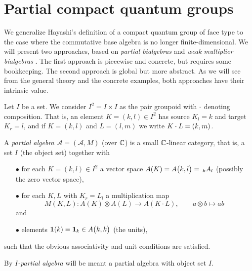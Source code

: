 \section{Partial compact quantum groups}

We generalize Hayashi's definition of a compact quantum group of face type \cite{Hay1} to the case where the commutative base algebra is no longer finite-dimensional. We will present two approaches, based on \emph{partial bialgebras} and \emph{weak multiplier bialgebras} \cite{Boh1}. The first approach is piecewise and concrete, but requires some bookkeeping. The second approach is global but more abstract. As we will see from the general theory and the concrete examples, both approaches have their intrinsic value.




Let $I$ be a set. We consider $I^2=I\times I$ as the pair groupoid with $\wmult$ denoting composition. That is, an element $K=(k,l)\in I^2$ has source $K_l = k$ and target $K_r=l$, and if $K=(k,l)$ and $L=(l,m)$ we write $K\wmult L = (k,m)$. %

\begin{Def} A \emph{partial algebra} $\mathscr{A}=(\mathscr{A},M)$ (over $\C$) is a small $\C$-linear category, that is, a set $I$ (the object set) together with %
\begin{itemize}
\item[$\bullet$] for each $K=(k,l)\in I^2$ a vector space $A(K) = \Grs{A}{k}{l}=\!\!\GrDA{A}{k}{l}$ (possibly the zero vector space),
\item[$\bullet$] for each $K,L$ with $K_r = L_l$ a multiplication map \[M(K,L):A(K) \otimes A(L)\rightarrow A(K\cdot L),\qquad a\otimes b \mapsto ab\]  and 
\item[$\bullet$] elements $\Unit(k) = \Unit_k \in \Grs{A}{k}{k}$ (the units), %
\end{itemize}
such that the obvious associativity and unit conditions are satisfied. 

By \emph{$I$-partial algebra} will be meant a partial algebra with object set $I$.
\end{Def}

